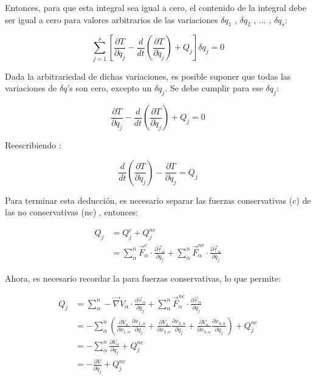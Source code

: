 \documentclass[/home/hernan/Documentos/Apuntes_mecanica_teorica/main.tex]{subfiles}
\begin{document}
    Entonces, para que esta integral sea igual a cero, el contenido de la integral debe ser igual a cero para valores arbitrarios de las variaciones $\delta q_{1}$ , $\delta q_{2}$ , ... , $\delta q_{s}$: 

    \begin{equation*}
        \sum_{j=1}^{s}  \left[\frac{\partial T}{\partial q_{j}}  - \frac{d}{d t} \left(\frac{\partial T}{\partial \dot{q}_{j}} \right)     + Q_{j}  \right] \delta q_{j} = 0
    \end{equation*}

    Dada la arbitrariedad de dichas variaciones, es posible suponer que todas las variaciones de $\delta q$'s son cero, excepto un $\delta q_{j}$. Se debe cumplir para ese $\delta q_{j}$:

    \begin{equation*}
        \frac{\partial T}{\partial q_{j}}  - \frac{d}{d t} \left(\frac{\partial T}{\partial \dot{q}_{j}} \right)     + Q_{j} = 0
    \end{equation*}

    Reescribiendo :

    \begin{equation*}
        \frac{d}{d t} \left(\frac{\partial T}{\partial \dot{q}_{j}} \right) - \frac{\partial T}{\partial q_{j}} = Q_{j}
    \end{equation*}

    Para terminar esta deducción, es necesario separar las fuerzas conservativas (c) de las no conservativas (nc) , entonces:

    \begin{align*}
        Q_{j} & = Q_{j}^{c} + Q_{j}^{nc} \\ 
            & = \sum_{\alpha}^{n} \vec{F}_{\alpha}^{c} \cdot \frac{\partial \vec{r}_{\alpha}}{\partial q_{j}} + \sum_{\alpha}^{n} \vec{F}_{\alpha}^{nc} \cdot \frac{\partial \vec{r}_{\alpha}}{\partial q_{j}}
    \end{align*}

    Ahora, es necesario recordar la  para fuerzas conservativas, lo que permite: 

    \begin{align*}
        Q_{j} & = \sum_{\alpha}^{n} - \vec{\nabla} V_{\alpha} \cdot \frac{\partial \vec{r}_{\alpha}}{\partial q_{j}} + \sum_{\alpha}^{n} \vec{F}_{\alpha}^{nc} \cdot \frac{\partial \vec{r}_{\alpha}}{\partial q_{j}} \\ 
        & =  - \sum_{\alpha}^{n} \left( \frac{\partial V_{\alpha}}{\partial x_{1,\alpha}} \frac{\partial x_{1,\alpha}}{\partial q_{j}} +   \frac{\partial V_{\alpha}}{\partial x_{2,\alpha}} \frac{\partial x_{2,\alpha}}{\partial q_{j}} + \frac{\partial V_{\alpha}}{\partial x_{3,\alpha}} \frac{\partial x_{3,\alpha}}{\partial q_{j}} \right) + Q_{j}^{nc} \\ 
        & = - \sum_{\alpha}^{n} \frac{\partial V_{\alpha}}{\partial q_{j}} + Q_{j}^{nc} \\ 
        & = - \frac{\partial V}{\partial q_{j}} + Q_{j}^{nc}
    \end{align*}
\end{document}
